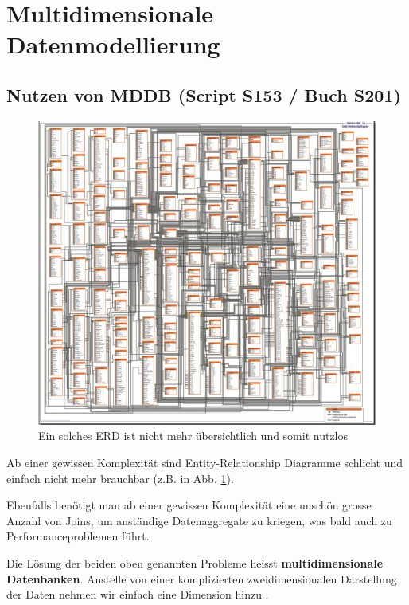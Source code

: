 \documentclass[a4paper, 11pt, nofootinbib]{article}
\begin{document}
\newpage

\section{Multidimensionale Datenmodellierung}
\subsection{Nutzen von MDDB (Script S153 / Buch S201)}
\begin{figure}
	\centering
	\includegraphics[keepaspectratio=true,height=18\baselineskip]{erd.JPG}
	\caption{Ein solches ERD ist nicht mehr übersichtlich und somit nutzlos}
	\label{fig:erd}
\end{figure}
Ab einer gewissen Komplexität sind Entity-Relationship Diagramme schlicht und einfach nicht mehr brauchbar (z.B. in Abb. \ref{fig:erd}).

\vspace{10px}

\noindent Ebenfalls benötigt man ab einer gewissen Komplexität eine unschön grosse Anzahl von Joins, um anständige Datenaggregate zu kriegen, was bald auch zu Performanceproblemen führt. 

\vspace{10px}

\noindent Die Lösung der beiden oben genannten Probleme heisst \textbf{multidimensionale Datenbanken}. Anstelle von einer komplizierten zweidimensionalen Darstellung der Daten nehmen wir einfach eine Dimension hinzu .
\end{document}
